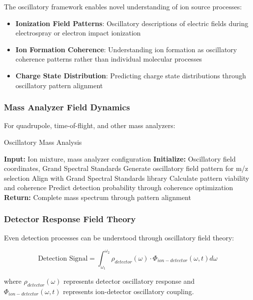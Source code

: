 \documentclass[11pt,a4paper]{article}
\theoremstyle{remark}
\begin{document}
The oscillatory framework enables novel understanding of ion source processes:

\begin{itemize}
\item \textbf{Ionization Field Patterns}: Oscillatory descriptions of electric fields during electrospray or electron impact ionization
\item \textbf{Ion Formation Coherence}: Understanding ion formation as oscillatory coherence patterns rather than individual molecular processes
\item \textbf{Charge State Distribution}: Predicting charge state distributions through oscillatory pattern alignment
\end{itemize}

\subsubsection{Mass Analyzer Field Dynamics}

For quadrupole, time-of-flight, and other mass analyzers:

\begin{algorithm}
\caption{Oscillatory Mass Analysis}
\begin{algorithmic}[1]
\State \textbf{Input:} Ion mixture, mass analyzer configuration
\State \textbf{Initialize:} Oscillatory field coordinates, Grand Spectral Standards
\State Generate oscillatory field pattern for m/z selection
\State Align with Grand Spectral Standards library
\State Calculate pattern viability and coherence
\State Predict detection probability through coherence optimization
\EndFor
\State \textbf{Return:} Complete mass spectrum through pattern alignment
\end{algorithmic}
\end{algorithm}

\subsubsection{Detector Response Field Theory}

Even detection processes can be understood through oscillatory field theory:

\begin{equation}
\text{Detection Signal} = \int_{\omega_1}^{\omega_2} \rho_{detector}(\omega) \cdot \Phi_{ion-detector}(\omega, t) d\omega
\end{equation}

where $\rho_{detector}(\omega)$ represents detector oscillatory response and $\Phi_{ion-detector}(\omega, t)$ represents ion-detector oscillatory coupling.
\end{document}
